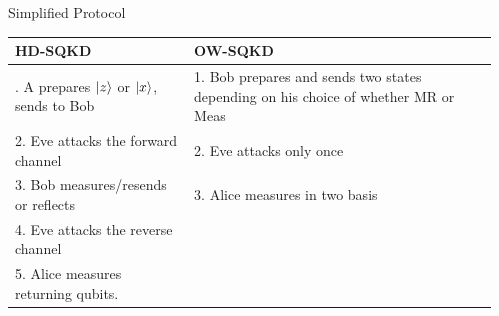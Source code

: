 \documentclass[final]{beamer}
\newlength{\onecolwid}
\newlength{\twocolwid}
\begin{document}
\begin{frame}[t]
\begin{columns}[t]
\begin{column}{\twocolwid}
\begin{columns}[t,totalwidth=\twocolwid]
\begin{column}{\onecolwid} %


\begin{block}{Simplified Protocol}



      \begin{tabular}{|p{14cm}|p{14cm}|}
      	\hline
      	\textbf{HD-SQKD} & \textbf{OW-SQKD}\\
      	\hline \arrayrulecolor{lightgray} \hline
      	1. A prepares $\ket{z}$ or $\ket{x}$, sends to Bob  & 1. Bob prepares and sends two states depending on his choice of whether MR or Meas\\ \hline
      	2. Eve attacks the forward channel  & 2. Eve attacks only once\\ \hline
      	3. Bob measures/resends or reflects & 3. Alice measures in two basis \\ \hline
      	4. Eve attacks the reverse channel & \\ \cline{1-1}
		5. Alice measures returning qubits. & \\
      	\hline
      \end{tabular}



\end{block}


\end{column} %

\begin{column}{\onecolwid} %


\end{column}
\end{columns}
\end{column}
\end{columns}
\end{frame}
\end{document}
